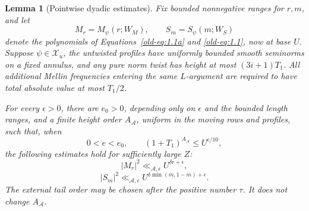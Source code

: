 \documentclass[11pt,a4paper]{article}
\numberwithin{equation}{section}
\numberwithin{figure}{section}
\newtheorem{lemma}[theorem]{Lemma}
\theoremstyle{definition}
\theoremstyle{remark}
\begin{document}
\begin{lemma}[Pointwise dyadic estimates]\label{lem:detector-dyads}
Fix bounded nonnegative ranges for \(r,m\), and let
\[
 M_r=M_\psi(r;W_M),\qquad S_m=S_\psi(m;W_S)
\]
denote the polynomials of Equations~\eqref{old-eq:1.1a} and
\eqref{old-eq:1.1}, now at base \(U\).  Suppose
\(\psi\in\mathcal X_u\), the untwisted profiles have uniformly
bounded smooth seminorms on a fixed annulus, and any pure norm twist
has height at most \((3i+1)T_1\).  All additional Mellin frequencies
entering the same \(L\)-argument are required to have total absolute
value at most \(T_1/2\).

For every \(\epsilon>0\), there are \(e_0>0\), depending only on
\(\epsilon\) and the bounded length ranges, and a finite height
order \(A_{\mathcal A}\), uniform in the moving rows and profiles,
such that, when
\[
 0<e<e_0,\qquad (1+T_1)^{A_{\mathcal A}}\le U^{\epsilon/10},
\]
the following estimates hold for sufficiently large \(Z\):
\begin{equation}
 |M_r|^2\ll_{\mathcal A,\epsilon}U^{\delta r+\epsilon},
 \label{old-eq:6.2}
\end{equation}
\begin{equation}
 |S_m|^2\ll_{\mathcal A,\epsilon}
       U^{\delta\min(m,1-m)+\epsilon}.
 \label{old-eq:6.3}
\end{equation}
The external tail order may be chosen after the positive number
\(\tau\).  It does not change \(A_{\mathcal A}\).
\end{lemma}
\end{document}

